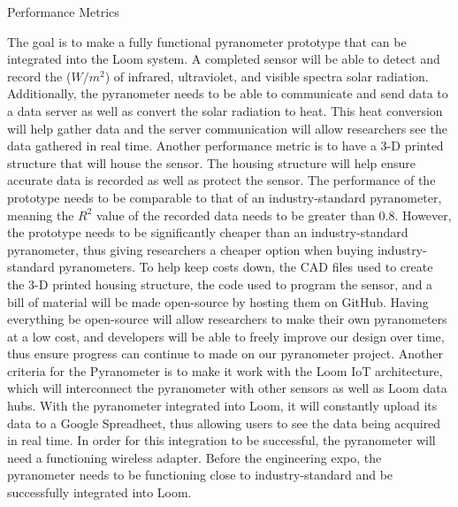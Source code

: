 \documentclass[10pt,draftclsnofoot,onecolumn,letterpaper]{article}
\begin{document}
    \vspace{\baselineskip}
    \begin{Center}
    {\fontsize{14pt}{16.8pt}\selectfont Performance Metrics\par}
    \end{Center}\par
        
    {\fontsize{10pt}{12.0pt}\selectfont
    The goal is to make a fully functional pyranometer prototype that can be integrated into the Loom system. A completed sensor will be able to detect and record the ($W/m^2$) of infrared, ultraviolet, and visible spectra solar radiation. Additionally, the pyranometer needs to be able to communicate and send data to a data server as well as convert the solar radiation to heat. This heat conversion will help gather data and the server communication will allow researchers see the data gathered in real time. Another performance metric is to have a 3-D printed structure that will house the sensor. The housing structure will help ensure accurate data is recorded as well as protect the sensor. The performance of the prototype needs to be comparable to that of an industry-standard pyranometer, meaning the $R^2$ value of the recorded data needs to be greater than 0.8. However, the prototype needs to be significantly cheaper than an industry-standard pyranometer, thus giving researchers a cheaper option when buying industry-standard pyranometers. To help keep costs down, the CAD files used to create the 3-D printed housing structure, the code used to program the sensor, and a bill of material will be made open-source by hosting them on GitHub. Having everything be open-source will allow researchers to make their own pyranometers at a low cost, and developers will be able to freely improve our design over time, thus ensure progress can continue to made on our pyranometer project. Another criteria for the Pyranometer is to make it work with the Loom IoT architecture, which will interconnect the pyranometer with other sensors as well as Loom data hubs. With the pyranometer integrated into Loom, it will constantly upload its data to a Google Spreadheet, thus allowing users to see the data being acquired in real time. In order for this integration to be successful, the pyranometer will need a functioning wireless adapter. Before the engineering expo, the pyranometer needs to be functioning close to industry-standard and be successfully integrated into Loom.
    \par}\par
        
    
\end{document}
